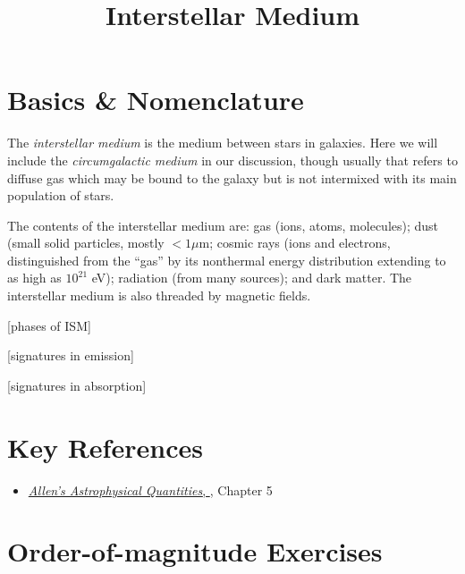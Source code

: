 \title{\bf Interstellar Medium}

\section{Basics \& Nomenclature}

The {\it interstellar medium} is the medium between stars in
galaxies. Here we will include the {\it circumgalactic medium} in our
discussion, though usually that refers to diffuse gas which may be
bound to the galaxy but is not intermixed with its main population of
stars.

The contents of the interstellar medium are: gas (ions, atoms,
molecules); dust (small solid particles, mostly $< 1\mu$m; cosmic rays
(ions and electrons, distinguished from the ``gas'' by its nonthermal
energy distribution extending to as high as $10^{21}$ eV); radiation
(from many sources); and dark matter.  The interstellar medium is also
threaded by magnetic fields.

[phases of ISM] 

[signatures in emission]

[signatures in absorption]


\section{Key References}

\begin{itemize}
  \item
    \href{http://adsabs.harvard.edu/abs/2000asqu.book.....C}{
    {\it Allen's Astrophysical Quantities},
      \citet{cox00a}}, Chapter 5
\end{itemize}

\section{Order-of-magnitude Exercises}

